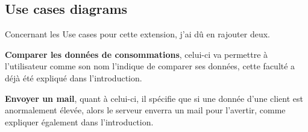 \subsection{Use cases diagrams}

\begin{flushleft}
Concernant les Use cases pour cette extension, j'ai dû en rajouter deux.
\end{flushleft}

\begin{flushleft}
\textbf{Comparer les données de consommations}, celui-ci va permettre à l'utilisateur comme son nom l'indique de comparer ses données, cette faculté a déjà été expliqué dans l'introduction.
\end{flushleft}

\begin{flushleft}
\textbf{Envoyer un mail}, quant à celui-ci, il spécifie que si une donnée d'une client est anormalement élevée, alors le serveur enverra un mail pour l'avertir, comme expliquer également dans l'introduction.
\end{flushleft}


